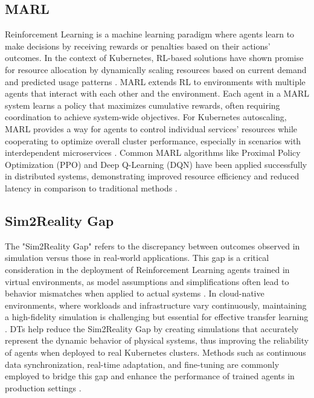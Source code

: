 \documentclass[conference]{IEEEtran}
\begin{document}
\subsection{MARL}
Reinforcement Learning is a machine learning paradigm where agents learn to make decisions by receiving rewards or penalties based on their actions' outcomes. In the context of Kubernetes, RL-based solutions have shown promise for resource allocation by dynamically scaling resources based on current demand and predicted usage patterns \cite{li_rl_resource_allocation}. MARL extends RL to environments with multiple agents that interact with each other and the environment. Each agent in a MARL system learns a policy that maximizes cumulative rewards, often requiring coordination to achieve system-wide objectives. For Kubernetes autoscaling, MARL provides a way for agents to control individual services' resources while cooperating to optimize overall cluster performance, especially in scenarios with interdependent microservices \cite{zhang_marl_k8s}. Common MARL algorithms like Proximal Policy Optimization (PPO) and Deep Q-Learning (DQN) have been applied successfully in distributed systems, demonstrating improved resource efficiency and reduced latency in comparison to traditional methods \cite{schwartz_drl_cloud}.

\subsection{Sim2Reality Gap}
The "Sim2Reality Gap" refers to the discrepancy between outcomes observed in simulation versus those in real-world applications. This gap is a critical consideration in the deployment of Reinforcement Learning agents trained in virtual environments, as model assumptions and simplifications often lead to behavior mismatches when applied to actual systems \cite{nguyen_sim2reality}. In cloud-native environments, where workloads and infrastructure vary continuously, maintaining a high-fidelity simulation is challenging but essential for effective transfer learning \cite{tan_nn_resource_approx}. DTs help reduce the Sim2Reality Gap by creating simulations that accurately represent the dynamic behavior of physical systems, thus improving the reliability of agents when deployed to real Kubernetes clusters. Methods such as continuous data synchronization, real-time adaptation, and fine-tuning are commonly employed to bridge this gap and enhance the performance of trained agents in production settings \cite{wu_multi_objective_rl}.
\end{document}
